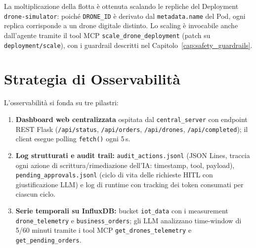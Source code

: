 La moltiplicazione della flotta è ottenuta scalando le repliche del Deployment \texttt{drone-simulator}: poiché \texttt{DRONE\_ID} è derivato dal \texttt{metadata.name} del Pod, ogni replica corrisponde a un drone digitale distinto. Lo scaling è invocabile anche dall'agente tramite il tool MCP \texttt{scale\_drone\_deployment} (patch su \texttt{deployment/scale}), con i guardrail descritti nel Capitolo~\ref{cap:safety_guardrails}.

\section{Strategia di Osservabilità}
\label{sec:osservabilita}

L'osservabilità si fonda su tre pilastri:
\begin{enumerate}
    \item \textbf{Dashboard web centralizzata} ospitata dal \texttt{central\_server} con endpoint REST Flask (\texttt{/api/status}, \texttt{/api/orders}, \texttt{/api/drones}, \texttt{/api/completed}); il client esegue polling \texttt{fetch()} ogni 5\,s.
    \item \textbf{Log strutturati e audit trail:} \texttt{audit\_actions.jsonl} (JSON Lines, traccia ogni azione di scrittura/rimediazione dell'IA: timestamp, tool, payload), \texttt{pending\_approvals.jsonl} (ciclo di vita delle richieste HITL con giustificazione LLM) e log di runtime con tracking dei token consumati per ciascun ciclo.
    \item \textbf{Serie temporali su InfluxDB:} bucket \texttt{iot\_data} con i measurement \texttt{drone\_telemetry} e \texttt{business\_orders}; gli LLM analizzano time-window di 5/60 minuti tramite i tool MCP \texttt{get\_drones\_telemetry} e \texttt{get\_pending\_orders}.
\end{enumerate}
